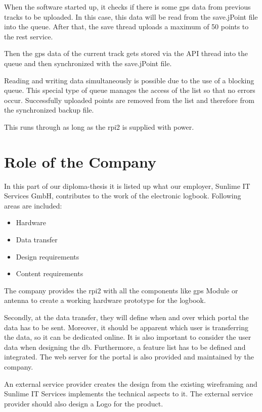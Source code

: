 When the software started up, it checks if there is some \gls{gps} data from previous tracks to be uploaded. In this case, this data will be read from the save.jPoint file into the queue. After that, the save thread uploads a maximum of 50 points to the \gls{rest} service. 


Then the \gls{gps} data of the current track gets stored via the API thread into the queue and then synchronized with the save.jPoint file.

Reading and writing data simultaneously is possible due to the use of a blocking queue. This special type of queue manages the access of the list so that no errors occur.\newline
Successfully uploaded points are removed from the list and therefore from the synchronized backup file.

This runs through as long as the \gls{rpi2} is supplied with power.
\clearpageauthor

\newpage
\section*{Role of the Company}
In this part of our diploma-thesis it is listed up what our employer, Sunlime IT Services GmbH, contributes to the work of the electronic logbook. Following areas are included:
\begin{itemize}
\item Hardware
\item Data transfer
\item Design requirements
\item Content requirements
\end{itemize}
The company provides the \gls{rpi2} with all the components like \gls{gps} Module or antenna to create a working hardware prototype for the logbook.

Secondly, at the data transfer, they will define when and over which portal the data has to be sent. Moreover, it should be apparent which user is transferring the data, so it can be dedicated online. It is also important to consider the user data when designing the \gls{db}. Furthermore, a feature list has to be defined and integrated.
The web server for the portal is also provided and maintained by the company.

An external service provider creates the design from the existing wireframing and Sunlime IT Services implements the technical aspects to it. The external service provider should also design a Logo for the product.


